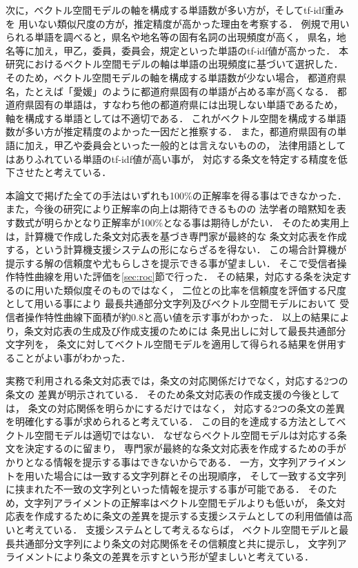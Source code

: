 \documentclass[japanese]{jnlp_1.4}
\begin{document}
次に，ベクトル空間モデルの軸を構成する単語数が多い方が，そしてtf-idf重みを
用いない類似尺度の方が，推定精度が高かった理由を考察する．
例規で用いられる単語を調べると，県名や地名等の固有名詞の出現頻度が高く，
県名，地名等に加え，甲乙，委員，委員会，規定といった単語のtf-idf値が高かった．
本研究におけるベクトル空間モデルの軸は単語の出現頻度に基づいて選択した．
そのため，ベクトル空間モデルの軸を構成する単語数が少ない場合，
都道府県名，たとえば「愛媛」のように都道府県固有の単語が占める率が高くなる．
都道府県固有の単語は，すなわち他の都道府県には出現しない単語であるため，
軸を構成する単語としては不適切である．
これがベクトル空間を構成する単語数が多い方が推定精度のよかった一因だと推察する．
また，都道府県固有の単語に加え，甲乙や委員会といった一般的とは言えないものの，
法律用語としてはありふれている単語のtf-idf値が高い事が，
対応する条文を特定する精度を低下させたと考えている．


本論文で掲げた全ての手法はいずれも100\%の正解率を得る事はできなかった．
また，今後の研究により正解率の向上は期待できるものの
法学者の暗黙知を表す数式が明らかとなり正解率が100\%となる事は期待しがたい．
そのため実用上は，計算機で作成した条文対応表を基づき専門家が最終的な
条文対応表を作成する，という計算機支援システムの形にならざるを得ない．
この場合計算機が提示する解の信頼度や尤もらしさを提示できる事が望ましい．
そこで受信者操作特性曲線を用いた評価を\ref{sec:roc}節で行った．
その結果，対応する条を決定するのに用いた類似度そのものではなく，
二位との比率を信頼度を評価する尺度として用いる事により
最長共通部分文字列及びベクトル空間モデルにおいて
受信者操作特性曲線下面積が約0.8と高い値を示す事がわかった．
以上の結果により，条文対応表の生成及び作成支援のためには
条見出しに対して最長共通部分文字列を，
条文に対してベクトル空間モデルを適用して得られる結果を併用することがよい事がわかった．

実務で利用される条文対応表では，条文の対応関係だけでなく，対応する2つの条文の
差異が明示されている．
そのため条文対応表の作成支援の今後としては，
条文の対応関係を明らかにするだけではなく，
対応する2つの条文の差異を明確化する事が求められると考えている．
この目的を達成する方法としてベクトル空間モデルは適切ではない．
なぜならベクトル空間モデルは対応する条文を決定するのに留まり，
専門家が最終的な条文対応表を作成するための手がかりとなる情報を提示する事はできないからである．
一方，文字列アライメントを用いた場合には一致する文字列群とその出現順序，
そして一致する文字列に挟まれた不一致の文字列といった情報を提示する事が可能である．
そのため，文字列アライメントの正解率はベクトル空間モデルよりも低いが，
条文対応表を作成するために条文の差異を提示する支援システムとしての利用価値は高いと考えている．
支援システムとして考えるならば，
ベクトル空間モデルと最長共通部分文字列により条文の対応関係をその信頼度と共に提示し，
文字列アライメントにより条文の差異を示すという形が望ましいと考えている．
\end{document}
